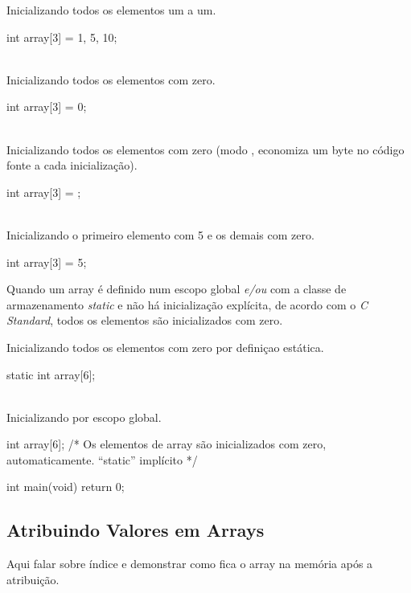 Inicializando todos os elementos um a um.

\begin{ccode}
  int array[3] = {1, 5, 10};
\end{ccode}
\\

Inicializando todos os elementos com zero.

\begin{ccode}
  int array[3] = {0};
\end{ccode}
\\

Inicializando todos os elementos com zero (modo , economiza um byte no código fonte a cada inicialização).

\begin{ccode}
  int array[3] = {};
\end{ccode}
\\

Inicializando o primeiro elemento com 5 e os demais com zero.

\begin{ccode}
  int array[3] = {5};
\end{ccode}

Quando um array é definido num escopo global \textit{e/ou} com a classe de armazenamento \textit{static} e não há inicialização explícita, de acordo com o \textit{C Standard}, todos os elementos são inicializados com zero.

Inicializando todos os elementos com zero por definiçao estática.

\begin{ccode}
  static int array[6];
\end{ccode}
\\

Inicializando por escopo global.

\begin{ccode}
int array[6];    /* Os elementos de array são inicializados
                    com zero, automaticamente. ``static'' implícito */

int main(void)
{
  return 0;
}
\end{ccode}

\subsection{Atribuindo Valores em Arrays}

Aqui falar sobre índice e demonstrar como fica o array na memória após a atribuição.

